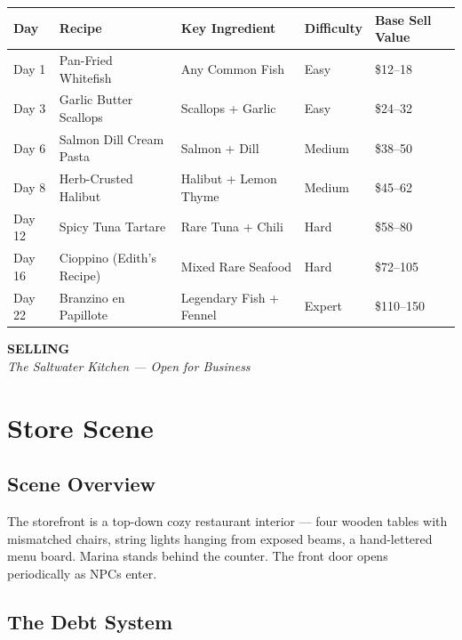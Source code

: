 \documentclass[11pt, letterpaper]{article}
\newcommand{\sectionband}[3]{%
  \begin{tcolorbox}[
    enhanced,
    colback=#3, colframe=#3,
    boxrule=0pt, arc=0pt,
    left=12pt, right=12pt, top=10pt, bottom=10pt,
    beforeafter skip=14pt,
  ]
    {\Large\bfseries\color{white}#1}\\[2pt]
    {\small\itshape\color{#3!30!white}#2}
  \end{tcolorbox}%
}
\newcommand{\altrow}{\rowcolor{rowalt}}
\begin{document}
\vspace{4pt}
\begin{tabularx}{\textwidth}{L{1.8cm} L{3.8cm} L{3cm} L{1.8cm} L{2.8cm}}
\toprule
{}
\textbf{\color{white}Day} & \textbf{\color{white}Recipe} & \textbf{\color{white}Key Ingredient} & \textbf{\color{white}Difficulty} & \textbf{\color{white}Base Sell Value} \\
\midrule
Day 1  & Pan-Fried Whitefish         & Any Common Fish          & Easy   & \$12--18  \\
\altrow
Day 3  & Garlic Butter Scallops      & Scallops + Garlic        & Easy   & \$24--32  \\
Day 6  & Salmon Dill Cream Pasta     & Salmon + Dill            & Medium & \$38--50  \\
\altrow
Day 8  & Herb-Crusted Halibut        & Halibut + Lemon Thyme    & Medium & \$45--62  \\
Day 12 & Spicy Tuna Tartare          & Rare Tuna + Chili        & Hard   & \$58--80  \\
\altrow
Day 16 & Cioppino (Edith's Recipe)   & Mixed Rare Seafood       & Hard   & \$72--105 \\
Day 22 & Branzino en Papillote       & Legendary Fish + Fennel  & Expert & \$110--150 \\
\bottomrule
\end{tabularx}

\newpage
\sectionband{SELLING}{The Saltwater Kitchen --- Open for Business}{coral}
\section{Store Scene}

\subsection{Scene Overview}

The storefront is a top-down cozy restaurant interior --- four wooden tables with mismatched chairs, string lights hanging from exposed beams, a hand-lettered menu board. Marina stands behind the counter. The front door opens periodically as NPCs enter.

\subsection{The Debt System}
\end{document}
